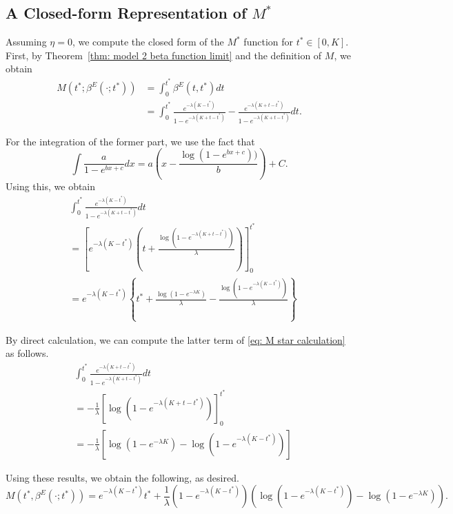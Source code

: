 \documentclass[12pt, letterpaper]{article}
\begin{document}
\subsection{A Closed-form Representation of $M^*$}\label{subsec: M closed form limit}

Assuming $\eta = 0$, we compute the closed form of the $M^*$ function for $t^* \in [0, K]$. First, by Theorem~\ref{thm: model 2 beta function limit} and the definition of $M$, we obtain
\begin{align}
    M(t^*; \beta^E(\cdot; t^*)) &= \int_0^{t^*} \beta^E(t, t^*) dt \\
    & = \int_0^{t^*} \frac{e^{- \lambda (K - t^*)}}{1 - e^{- \lambda (K + t - t^*)}} - \frac{e^{- \lambda (K + t - t^*)}}{1 - e^{- \lambda (K + t - t^*)}}dt. \label{eq: M star calculation}
\end{align}

For the integration of the former part, we use the fact that
\begin{equation}
    \int \frac{a}{1 - e^{bx + c}}dx = a \left(x - \frac{\log (1 - e^{bx + c}))}{b} \right) + C.
\end{equation}
Using this, we obtain
\begin{align}
    &\int_0^{t^*} \frac{e^{- \lambda (K - t^*)}}{1 - e^{- \lambda (K + t - t^*)}}dt\\
    & = \left[e^{-\lambda(K-t^*)} \left(t + \frac{\log \left( 1 - e^{- \lambda(K + t - t^*)} \right)}{\lambda} \right)  \right]_0^{t^*}\\
    & = e^{-\lambda(K-t^*)}\left\{t^* + \frac{\log \left( 1 - e^{- \lambda K} \right)}{\lambda} - \frac{\log \left( 1 - e^{- \lambda(K - t^*)} \right)}{\lambda}  \right\}
\end{align}

By direct calculation, we can compute the latter term of \eqref{eq: M star calculation} as follows.
\begin{align}
    & \int_0^{t^*} \frac{e^{- \lambda (K + t - t^*)}}{1 - e^{- \lambda (K + t - t^*)}}dt\\
    & = - \frac{1}{\lambda}\left[\log\left(1 - e^{- \lambda(K + t - t^*)} \right) \right]_0^{t^*}\\
    & = - \frac{1}{\lambda}\left[\log\left(1 - e^{-\lambda K} \right) - \log \left(1 - e^{- \lambda(K - t^*)} \right) \right]
\end{align}

Using these results, we obtain the following, as desired.
\begin{equation}\label{eq: M closed form limit}
    M(t^*, \beta^E(\cdot; t^*)) = e^{-\lambda(K -t^*)} t^* + \frac{1}{\lambda}\left( 1 - e^{-\lambda(K - t^*)} \right)\left(\log \left(1 - e^{-\lambda (K - t^*)} \right) - \log \left(1 - e^{- \lambda K} \right) \right).
\end{equation}
\end{document}
